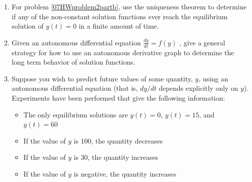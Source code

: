 \begin{enumerate}
\item	For problem \ref{07HWproblem2partb}, use the uniqueness theorem to determine if any of the non-constant solution functions ever reach the equilibrium solution of $y(t)=0$ in a finite amount of time. \label{07HWproblem4}

\item	Given an autonomous differential equation $\frac{dy}{dt}=f(y)$ , give a general strategy for how to use an autonomous derivative graph to determine the long term behavior of solution functions. \label{07HWproblem5}

\clearpage

\item	Suppose you wish to predict future values of some quantity, $y$, using an autonomous differential equation (that is, $dy/dt$ depends explicitly only on $y$). Experiments have been performed that give the following information: \label{07HWproblem6}
\begin{itemize}
\item	The only equilibrium solutions are $y(t)=0$, $y(t)=15$, and $y(t)=60$
\item	If the value of $y$ is 100, the quantity decreases
\item	If the value of $y$ is 30, the quantity increases
\item	If the value of $y$ is negative, the quantity increases
\end{itemize}


\end{enumerate}
